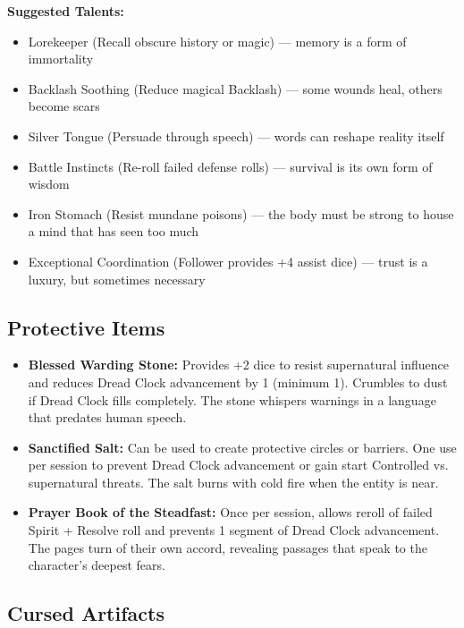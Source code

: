 \documentclass[11pt]{article}
\begin{document}
\textbf{Suggested Talents:}
\begin{itemize}
\item Lorekeeper (Recall obscure history or magic) — memory is a form of immortality
\item Backlash Soothing (Reduce magical Backlash) — some wounds heal, others become scars
\item Silver Tongue (Persuade through speech) — words can reshape reality itself
\item Battle Instincts (Re-roll failed defense rolls) — survival is its own form of wisdom
\item Iron Stomach (Resist mundane poisons) — the body must be strong to house a mind that has seen too much
\item Exceptional Coordination (Follower provides +4 assist dice) — trust is a luxury, but sometimes necessary
\end{itemize}

\subsection{Protective Items}

\begin{itemize}
\item \textbf{Blessed Warding Stone:} Provides +2 dice to resist supernatural influence and reduces Dread Clock advancement by 1 (minimum 1). Crumbles to dust if Dread Clock fills completely. The stone whispers warnings in a language that predates human speech.
\item \textbf{Sanctified Salt:} Can be used to create protective circles or barriers. One use per session to prevent Dread Clock advancement or gain start Controlled vs. supernatural threats. The salt burns with cold fire when the entity is near.
\item \textbf{Prayer Book of the Steadfast:} Once per session, allows reroll of failed Spirit + Resolve roll and prevents 1 segment of Dread Clock advancement. The pages turn of their own accord, revealing passages that speak to the character's deepest fears.
\end{itemize}

\subsection{Cursed Artifacts}
\end{document}
